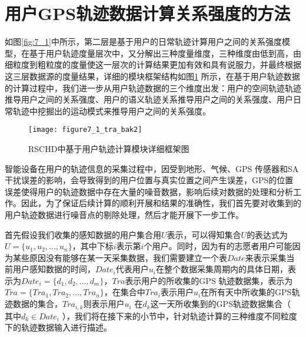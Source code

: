 \section{用户GPS轨迹数据计算关系强度的方法}
\label{sec:section4-1}
如图\ref{fig:7_1}中所示，第二层是基于用户的日常轨迹计算用户之间的关系强度模型，在基于用户轨迹度量层次中，又分解出三种度量维度，三种维度由低到高，由细粒度到粗粒度的度量使这一层次的计算结果更加有效和具有说服力，并最终根据这三层数据源的度量结果，详细的模块框架结构如图\ref{fig:7_1_tra} 所示，在基于用户轨迹数据的计算过程中，我们进一步从用户轨迹数据的三个维度出发：用户的空间轨迹轨迹推导用户之间的关系强度、用户的语义轨迹关系推导用户之间的关系强度、用户日常轨迹中挖掘出的运动模式来推导用户之间的关系强度。
\begin{figure}[htp]
\centering
\texttt{[image: figure7\_1\_tra\_bak2]}
\caption{RSCHD中基于用户轨迹计算模块详细框架图}
\label{fig:7_1_tra}
\end{figure}

\par 智能设备在用户的轨迹信息的采集过程中，因受到地形、气候、GPS 传感器和SA干扰误差的影响，会导致得到的用户位置与真实位置之间产生误差，GPS的位置误差使得用户的轨迹数据中存在大量的噪音数据，影响后续对数据的处理和分析工作。因此，为了保证后续计算的顺利开展和结果的准确性，我们首先要对收集到的用户轨迹数据进行噪音点的剔除处理，然后才能开展下一步工作。
\par 首先假设我们收集的感知数据的用户集合用$U$表示，可以得知集合$U$的表达式为$U=\{u_{1},u_{2},...,u_{n}\}$，其中下标$i$表示第$i$个用户。同时，因为有的志愿者用户可能因为某些原因没有能够在某一天采集数据，我们需要建立一个表$Date$来表示采集当前用户感知数据的时间，$Date_{i}$代表用户$u_{i}$在整个数据采集周期内的具体日期，表示为$Date_{i}=\{d_{1},d_{2},...,d_{m}\}$，$Tra$表示用户的所收集的GPS 轨迹数据集，表示为$Tra=\{Tra_{1},Tra_{2},...,Tra_{n}\}$，在集合中$Tra_{i}$表示用户$u_{i}$在所有天中所收集的GPS轨迹数据的集合，$Tra_{i,k}$则表示用户$u_{i}$ 在$d_{k}$这一天所收集到的GPS轨迹数据集合（ 其中$ d_{k} \in Date_{i}$ ），我们将在接下来的小节中，针对轨迹计算的三种维度不同粒度下的轨迹数据输入进行描述。



